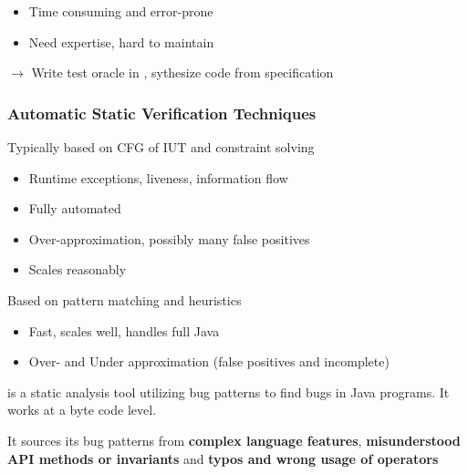 \documentclass[
    ../../Software_Engineering_Summary.tex,
]
{subfiles}
\begin{document}
\begin{defbox}
    \begin{itemize}
        \item {} Time consuming and error-prone
        \item {} Need expertise, hard to maintain
    \end{itemize}
    $\rightarrow$ Write test oracle in , sythesize code from specification
\end{defbox}
\begin{samepage}    
\subsubsection{Automatic Static Verification Techniques}
\begin{defbox}
    Typically based on CFG of IUT and constraint solving
    \begin{itemize}
        \item Runtime exceptions, liveness, information flow
        \item Fully automated
        \item Over-approximation, possibly many false positives
        \item Scales reasonably
    \end{itemize}
\end{defbox}
\end{samepage}
\begin{defbox}
    Based on pattern matching and heuristics
    \begin{itemize}
        \item Fast, scales well, handles full Java
        \item Over- and Under approximation (false positives and incomplete)
    \end{itemize}

     is a static analysis tool utilizing bug patterns to find bugs in Java programs. It works at a byte code level.

    It sources its bug patterns from \textbf{complex language features}, \textbf{misunderstood API methods or invariants} and \textbf{typos and wrong usage of operators}
\end{defbox}
\end{document}
